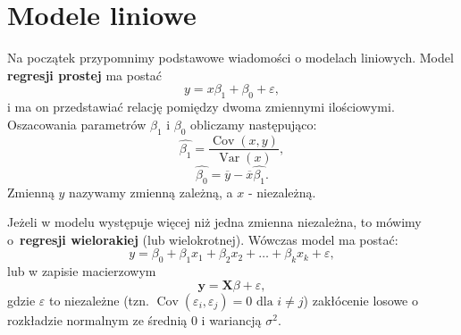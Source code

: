 \documentclass[12pt]{mwbk}
\theoremstyle{plain}
\theoremstyle{definition}
\theoremstyle{definition}
\newcommand{\yy}{\mathbf{y}}
\begin{document}
\section{Modele liniowe}
Na początek przypomnimy podstawowe wiadomości o modelach liniowych. Model \textbf{regresji prostej} ma postać $$y=x \beta_1+\beta_0 + \varepsilon,$$ i ma on przedstawiać relację pomiędzy dwoma zmiennymi ilościowymi. Oszacowania parametrów $\beta_1$ i $\beta_0$ obliczamy następująco:
$$\hat{\beta_1}=\frac{\operatorname{Cov}(x,y)}{\operatorname{Var}(x)},$$
$$\hat{\beta_0}=\overline{y}-\overline{x}\hat{\beta_1}.$$ Zmienną $y$ nazywamy zmienną zależną, a $x$ - niezależną.

Jeżeli w modelu występuje więcej niż jedna zmienna niezależna, to mówimy o~\textbf{regresji wielorakiej} (lub wielokrotnej). Wówczas model ma postać: $$y=\beta_0+\beta_1 x_1+\beta_2 x_2 + \ldots + \beta_k x_k + \varepsilon,$$ lub w zapisie macierzowym $$\yy=\mathbf{X}\beta+\varepsilon,$$
gdzie $\varepsilon$ to niezależne (tzn. $\operatorname{Cov}(\varepsilon_i, \varepsilon_j)=0 \text{ dla }i\neq j$) zakłócenie losowe o rozkładzie normalnym ze średnią 0 i wariancją $\sigma^2$.
\end{document}
